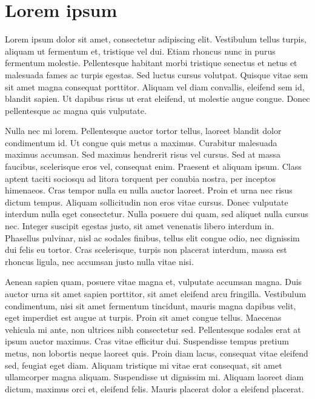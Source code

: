 \documentclass[12pt, a4paper]{klokurier}
\begin{document}
\newcommand{\thedate}{Januar 2017}
\header%
\section*{Lorem ipsum}
Lorem ipsum dolor sit amet, consectetur adipiscing elit. Vestibulum tellus turpis, aliquam ut fermentum et, tristique vel dui. Etiam rhoncus nunc in purus fermentum molestie.
Pellentesque habitant morbi tristique senectus et netus et malesuada fames ac turpis egestas. Sed luctus cursus volutpat. Quisque vitae sem sit amet magna consequat porttitor.
Aliquam vel diam convallis, eleifend sem id, blandit sapien. Ut dapibus risus ut erat eleifend, ut molestie augue congue. Donec pellentesque ac magna quis vulputate.

Nulla nec mi lorem. Pellentesque auctor tortor tellus, laoreet blandit dolor condimentum id. Ut congue quis metus a maximus. Curabitur malesuada maximus accumsan.
Sed maximus hendrerit risus vel cursus. Sed at massa faucibus, scelerisque eros vel, consequat enim.
Praesent et aliquam ipsum. Class aptent taciti sociosqu ad litora torquent per conubia nostra, per inceptos himenaeos. Cras tempor nulla eu nulla auctor laoreet.
Proin et urna nec risus dictum tempus. Aliquam sollicitudin non eros vitae cursus. Donec vulputate interdum nulla eget consectetur.
Nulla posuere dui quam, sed aliquet nulla cursus nec. Integer suscipit egestas justo, sit amet venenatis libero interdum in.
Phasellus pulvinar, nisl ac sodales finibus, tellus elit congue odio, nec dignissim dui felis eu tortor.
Cras scelerisque, turpis non placerat interdum, massa est rhoncus ligula, nec accumsan justo nulla vitae nisi.

Aenean sapien quam, posuere vitae magna et, vulputate accumsan magna. Duis auctor urna sit amet sapien porttitor, sit amet eleifend arcu fringilla.
Vestibulum condimentum, nisi sit amet fermentum tincidunt, mauris magna dapibus velit, eget imperdiet est augue at turpis.
Proin sit amet congue tellus. Maecenas vehicula mi ante, non ultrices nibh consectetur sed. Pellentesque sodales erat at ipsum auctor maximus.
Cras vitae efficitur dui. Suspendisse tempus pretium metus, non lobortis neque laoreet quis.
Proin diam lacus, consequat vitae eleifend sed, feugiat eget diam. Aliquam tristique mi vitae erat consequat, sit amet ullamcorper magna aliquam.
Suspendisse ut dignissim mi. Aliquam laoreet diam dictum, maximus orci et, eleifend felis. Mauris placerat dolor a eleifend placerat.
\signature{reki}
\end{document}
